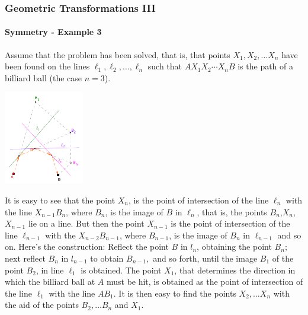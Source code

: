 \documentclass[8pt,xcolor=table,dvipsnames]{beamer}
\begin{document}
\begin{frame}[t]
    \frametitle{Geometric Transformations III}
    \framesubtitle{Symmetry - Example 3}
    Assume that the problem has been solved, that is, that points
    $X_1, X_2, \ldots X_n$ have been found on the lines $\ell_1, \ell_2, \ldots, \ell_n$ such that
    $A X_1 X_2 \cdots X_n B$ is the path of a billiard ball (the case $n = 3$).
    \begin{center}
        \includegraphics[width=3.5cm]{./svg/pdf/symmetry-3b.pdf}
    \end{center}
    \begin{overprint}
        It is easy to see that the point $X_n$, is the point of intersection of the line $\ell_n$ with the line $X_{n-1}B_n$,
        where $B_n$, is the image of $B$ in $\ell_n$, that is, the points $B_n$,$X_n$, $X_{n-1}$ lie on a line.
        \bigbreak
        But then the point $X_{n-1}$ is the point of intersection of the line $\ell_{n-1}$ with the $X_{n-2}B_{n-1}$,
        where $B_{n-1}$, is the image of $B_n$ in $\ell_{n-1}$ and so on.
        Here's the construction: Reflect the point $B$ in $l_n$, obtaining the point $B_n$;
        next reflect $B_n$ in $l_{n-1}$ to obtain $B_{n-1},$ and so forth, until the image $B_1$ of the point $B_2$, in line $\ell_1$ is obtained.
        \bigbreak
        The point $X_1$, that determines the direction in which the billiard ball at $A$ must be hit,
        is obtained as the point of intersection of the line $\ell_1$ with the line $AB_1$.
        It is then easy to find the points $X_2, \ldots X_n$ with the aid of the points $B_2, \ldots B_n$ and $X_1$.
    \end{overprint}
\end{frame}
\end{document}
